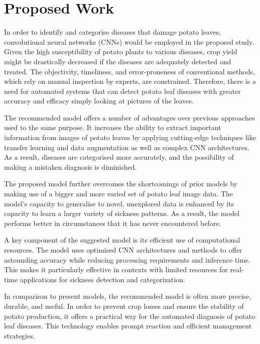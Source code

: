 \documentclass[conference]{IEEEtran}
\begin{document}



\section{Proposed Work}
In order to identify and categorise diseases that damage potato leaves, convolutional neural networks (CNNs) would be employed in the proposed study. Given the high susceptibility of potato plants to various diseases, crop yield might be drastically decreased if the diseases are adequately detected and treated. The objectivity, timeliness, and error-proneness of conventional methods, which rely on manual inspection by experts, are constrained. Therefore, there is a need for automated systems that can detect potato leaf diseases with greater accuracy and efficacy simply looking at pictures of the leaves.

The recommended model offers a number of advantages over previous approaches used to the same purpose. It increases the ability to extract important information from images of potato leaves by applying cutting-edge techniques like transfer learning and data augmentation as well as complex CNN architectures. As a result, diseases are categorised more accurately, and the possibility of making a mistaken diagnosis is diminished.

The proposed model further overcomes the shortcomings of prior models by making use of a bigger and more varied set of potato leaf image data. The model's capacity to generalise to novel, unexplored data is enhanced by its capacity to learn a larger variety of sickness patterns. As a result, the model performs better in circumstances that it has never encountered before.

A key component of the suggested model is its efficient use of computational resources. The model uses optimised CNN architectures and methods to offer astounding accuracy while reducing processing requirements and inference time. This makes it particularly effective in contexts with limited resources for real-time applications for sickness detection and categorization.

In comparison to present models, the recommended model is often more precise, durable, and useful. In order to prevent crop losses and ensure the stability of potato production, it offers a practical way for the automated diagnosis of potato leaf diseases. This technology enables prompt reaction and efficient management strategies.
\end{document}
